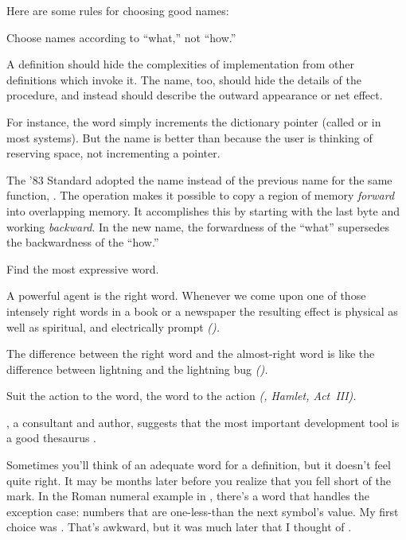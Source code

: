 \smallbreak
Here are some rules for choosing good names:
\begin{tip}
Choose names according to ``what,'' not ``how.''
\end{tip}
A definition should hide the complexities of implementation from other
definitions which invoke it.  The name, too, should hide the details
of the procedure, and instead should describe the outward appearance
or net effect.

For instance, the \Forth{} word  simply increments the
dictionary pointer (called  or  in most systems).
But the name  is better than  because the
user is thinking of reserving space, not incrementing a pointer.

The '83 Standard adopted the name  instead of the
previous name for the same function, .  The operation
makes it possible to copy a region of memory \emph{forward} into
overlapping memory.  It accomplishes this by starting with the last
byte and working \emph{backward}.  In the new name, the forwardness of
the ``what'' supersedes the backwardness of the ``how.''

\begin{tip}
Find the most expressive word.
\end{tip}

\begin{tfquot}
A powerful agent is the right word.  Whenever we come upon one of
those intensely right words in a book or a newspaper the resulting
effect is physical as well as spiritual, and electrically prompt
\emph{().}

The difference between the right word and the almost-right word is
like the difference between lightning and the lightning bug
\emph{().}

Suit the action to the word, the word to the action
\emph{(, Hamlet, Act~III).}
\end{tfquot}
,
a \Forth{} consultant and author, suggests that the most important
\Forth{} development tool is a good thesaurus \cite{laxen}.%

Sometimes you'll think of an adequate word for a definition, but it
doesn't feel quite right.  It may be months later before you realize
that you fell short of the mark.  In the Roman numeral example in
, there's a word that handles the exception case: numbers that
are one-less-than the next symbol's value.  My first choice was
.  That's awkward, but it was much later that I thought
of .

